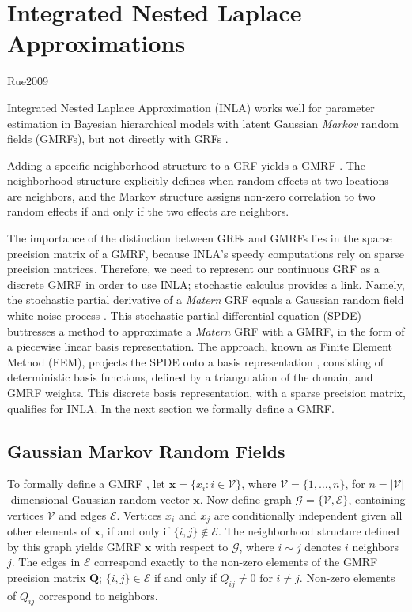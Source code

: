 \section{Integrated Nested Laplace Approximations} \label{INLA} %

Rue2009

Integrated Nested Laplace Approximation (INLA) works well for parameter estimation in Bayesian hierarchical models with latent Gaussian {\it Markov} random fields (GMRFs), but not directly with GRFs \citep{Rue2007}.

Adding a specific neighborhood structure to a GRF yields a GMRF \citep{Rue2007}. The neighborhood structure explicitly defines when random effects at two locations are neighbors, and the Markov structure assigns non-zero correlation to two random effects if and only if the two effects are neighbors. 

The importance of the distinction between GRFs and GMRFs lies in the sparse precision matrix of a GMRF, because INLA's speedy computations rely on sparse precision matrices. Therefore, we need to represent our continuous GRF as a discrete GMRF in order to use INLA; stochastic calculus provides a link. Namely, the stochastic partial derivative of a {\it Matern} GRF equals a Gaussian random field white noise process \citep{Lindgren2011}. This stochastic partial differential equation (SPDE) buttresses a method to approximate a {\it Matern} GRF with a GMRF, in the form of a piecewise linear basis representation. The approach, known as Finite Element Method (FEM), projects the SPDE onto a basis representation \citep{Dhatt2012}, consisting of deterministic basis functions, defined by a triangulation of the domain, and GMRF weights. This discrete basis representation, with a sparse precision matrix, qualifies for INLA. In the next section we formally define a GMRF.


\subsection{Gaussian Markov Random Fields}

To formally define a GMRF \citep{Rue2007}, let $\pmb{x} = \{ x_{i}:i \in \mathscr{V} \}$, where $\mathscr{V} = \{1,\dots,n\}$, for $n = |\mathscr{V}|$-dimensional Gaussian random vector $\pmb{x}$. Now define graph $\mathscr{G} = \{ \mathscr{V}, \mathscr{E} \}$, containing vertices $\mathscr{V}$ and edges $\mathscr{E}$. Vertices $x_{i}$ and $x_{j}$ are conditionally independent given all other elements of $\pmb{x}$, if and only if $\{i, j\} \notin \mathscr{E}$. The neighborhood structure defined by this graph yields GMRF $\pmb{x}$ with respect to $\mathscr{G}$, where $i \sim j$ denotes $i$ neighbors $j$. The edges in $\mathscr{E}$ correspond exactly to the non-zero elements of the GMRF precision matrix $\pmb{Q}$; $\{ i, j \} \in \mathscr{E}$ if and only if $Q_{ij} \neq 0 \text{ for } i \neq j$. Non-zero elements of $Q_{ij}$ correspond to neighbors.

